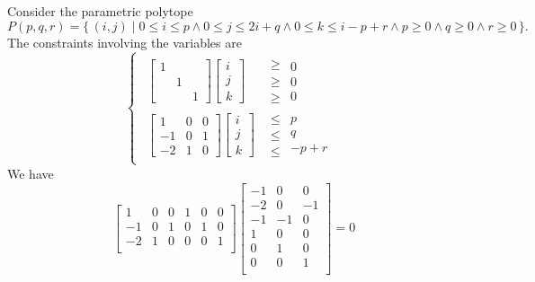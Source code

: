 \begin{example}
Consider the parametric polytope
$$
P(p,q,r) = \{\,
(i,j) \mid 0 \le i \le p \wedge
0 \le j \le 2 i + q \wedge
0 \le k \le i - p + r \wedge
p \ge 0 \wedge
q \ge 0 \wedge
r \ge 0
\,\}
.
$$
The constraints involving the variables are
$$
\begin{cases}
    \begin{aligned}
\begin{bmatrix}
1
\\
& 1
\\
& & 1
\end{bmatrix}
\begin{bmatrix}
i \\ j \\ k
\end{bmatrix}
&
\begin{matrix}
\ge
\\
\ge
\\
\ge
\end{matrix}
\begin{array}{l}
0
\\
0
\\
0
\end{array}
\\
\begin{bmatrix}
1 & 0 & 0
\\
-1 & 0 & 1
\\
-2 & 1 & 0
\end{bmatrix}
\begin{bmatrix}
i \\ j \\ k
\end{bmatrix}
&
\begin{matrix}
\le
\\
\le
\\
\le
\end{matrix}
\begin{array}{l}
p
\\
q
\\
-p + r
\end{array}
    \end{aligned}
\end{cases}
$$
We have
$$
\begin{bmatrix}
   1 &   0  &  0 &   1  &  0  &  0  \\
  -1 &   0  &  1 &   0  &  1  &  0  \\
  -2 &   1  &  0 &   0  &  0  &  1  \\
\end{bmatrix}
\begin{bmatrix}
  -1  &  0 &   0  \\
  -2  &  0 &  -1  \\
  -1  & -1 &   0  \\
   1  &  0 &   0  \\
   0  &  1 &   0  \\
   0  &  0 &   1  \\
\end{bmatrix}
= 0
$$


\end{example}
